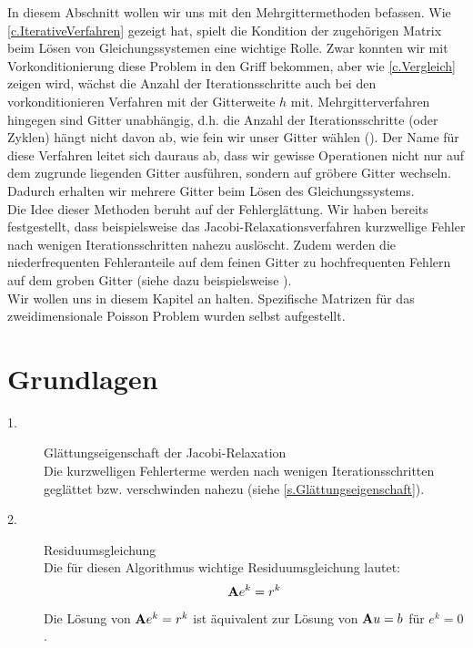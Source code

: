 In diesem Abschnitt wollen wir uns mit den Mehrgittermethoden befassen. Wie \autoref{c.IterativeVerfahren} gezeigt hat, spielt die Kondition der zugehörigen Matrix beim Lösen von Gleichungssystemen eine wichtige Rolle. Zwar konnten wir mit Vorkonditionierung diese Problem in den Griff bekommen, aber wie \autoref{c.Vergleich} zeigen wird, wächst die Anzahl der Iterationsschritte auch bei den vorkonditionieren Verfahren mit der Gitterweite $h$ mit. Mehrgitterverfahren hingegen sind Gitter unabhängig, d.h. die Anzahl der Iterationsschritte (oder Zyklen) hängt nicht davon ab, wie fein wir unser Gitter wählen (\cite{SAAD6}). Der Name für diese Verfahren leitet sich dauraus ab, dass wir gewisse Operationen nicht nur auf dem zugrunde liegenden Gitter ausführen, sondern auf gröbere Gitter wechseln. Dadurch erhalten wir mehrere Gitter beim Lösen des Gleichungssystems.\\
Die Idee dieser Methoden beruht auf der Fehlerglättung. Wir haben bereits festgestellt, dass beispielsweise das Jacobi-Relaxationsverfahren kurzwellige Fehler nach wenigen Iterationsschritten nahezu auslöscht. Zudem werden die niederfrequenten Fehleranteile auf dem feinen Gitter zu hochfrequenten Fehlern auf dem groben Gitter (siehe dazu beispielsweise \cite{STR}).\\
Wir wollen uns in diesem Kapitel an \cite{SAAD7} halten. Spezifische Matrizen für das zweidimensionale Poisson Problem wurden selbst aufgestellt.

\section{Grundlagen}\label{s.Idee MGM}

\begin{description}

\item[1.] Glättungseigenschaft der Jacobi-Relaxation \\
Die kurzwelligen Fehlerterme werden nach wenigen Iterationsschritten geglättet bzw. verschwinden nahezu (siehe \autoref{s.Glättungseigenschaft}).
\item[2.] Residuumsgleichung \\
Die für diesen Algorithmus wichtige Residuumsgleichung lautet:
\begin{equation}
{\textbf{A}} e^{k} = r^{k}
\end{equation}
Die Lösung von ${\textbf{A}} e^{k} = r^{k}$ ist äquivalent zur Lösung von ${\textbf{A}}u=b$ für $e^{k} = 0$.

\end{description}

